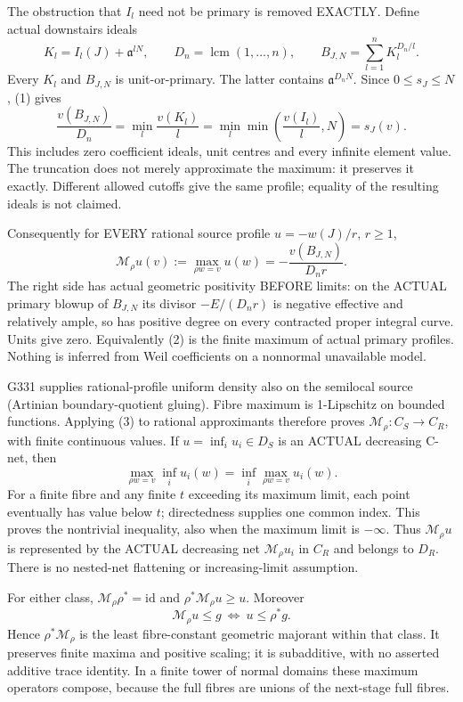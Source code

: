 \documentclass[11pt]{article}
\begin{document}
The obstruction that $I_l$ need not be primary is removed EXACTLY.
Define actual downstairs ideals
\[
 K_l=I_l(J)+\mathfrak a^{lN},\qquad
 D_n=\operatorname{lcm}(1,\ldots,n),\qquad
 B_{J,N}=\sum_{l=1}^n K_l^{D_n/l}.
\]
Every $K_l$ and $B_{J,N}$ is unit-or-primary. The latter contains
$\mathfrak a^{D_nN}$. Since $0\le s_J\le N$, (1) gives
\[
 \frac{v(B_{J,N})}{D_n}
 =\min_l\frac{v(K_l)}l
 =\min_l\min\left(\frac{v(I_l)}l,N\right)=s_J(v).             \tag{2}
\]
This includes zero coefficient ideals, unit centres and every infinite
element value. The truncation does not merely approximate the maximum:
it preserves it exactly. Different allowed cutoffs give the same profile;
equality of the resulting ideals is not claimed.

Consequently for EVERY rational source profile $u=-w(J)/r$, $r\ge1$,
\[
 \mathcal M_\rho u(v):=\max_{\rho w=v}u(w)
             =-\frac{v(B_{J,N})}{D_n r}.                    \tag{3}
\]
The right side has actual geometric positivity BEFORE limits: on the
ACTUAL primary blowup of $B_{J,N}$ its divisor $-E/(D_nr)$ is negative
effective and relatively ample, so has positive degree on every contracted
proper integral curve. Units give zero. Equivalently (2) is the finite
maximum of actual primary profiles. Nothing is inferred from Weil
coefficients on a nonnormal unavailable model.

G331 supplies rational-profile uniform density also on the semilocal
source (Artinian boundary-quotient gluing). Fibre maximum is 1-Lipschitz
on bounded functions. Applying (3) to rational approximants therefore
proves $\mathcal M_\rho:C_S\to C_R$, with finite continuous values.
If $u=\inf_i u_i\in D_S$ is an ACTUAL decreasing C-net, then
\[
 \max_{\rho w=v}\inf_i u_i(w)
       =\inf_i\max_{\rho w=v}u_i(w).                         \tag{4}
\]
For a finite fibre and any finite $t$ exceeding its maximum limit, each
point eventually has value below $t$; directedness supplies one common
index. This proves the nontrivial inequality, also when the maximum
limit is $-\infty$. Thus $\mathcal M_\rho u$ is represented by the
ACTUAL decreasing net $\mathcal M_\rho u_i$ in $C_R$ and belongs to $D_R$.
There is no nested-net flattening or increasing-limit assumption.

For either class, $\mathcal M_\rho\rho^*=\mathrm{id}$ and
$\rho^*\mathcal M_\rho u\ge u$. Moreover
\[
 \mathcal M_\rho u\le g\ \Longleftrightarrow\ u\le\rho^*g.
\]
Hence $\rho^*\mathcal M_\rho$ is the least fibre-constant geometric
majorant within that class. It preserves finite maxima and positive
scaling; it is subadditive, with no asserted additive trace identity.
In a finite tower of normal domains these maximum operators compose,
because the full fibres are unions of the next-stage full fibres.
\end{document}
